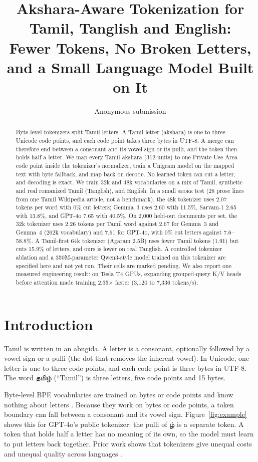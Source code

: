 \documentclass[11pt]{article}
\title{Akshara-Aware Tokenization for Tamil, Tanglish and English:\\
Fewer Tokens, No Broken Letters, and a Small Language Model Built on It}
\author{Anonymous submission}
\newcommand{\ta}[1]{{\tamilfont #1}}
\newcommand{\smoke}{\textsc{smoke}}
\begin{document}
\maketitle

\begin{abstract}
Byte-level tokenizers split Tamil letters.
A Tamil letter (akshara) is one to three Unicode code points, and each code point takes three bytes in UTF-8.
A merge can therefore end between a consonant and its vowel sign or its pulli, and the token then holds half a letter.
We map every Tamil akshara (312 units) to one Private Use Area code point inside the tokenizer's normalizer, train a Unigram model on the mapped text with byte fallback, and map back on decode.
No learned token can cut a letter, and decoding is exact.
We train 32k and 48k vocabularies on a mix of Tamil, synthetic and real romanized Tamil (Tanglish), and English.
In a small \smoke{} test (28 prose lines from one Tamil Wikipedia article, not a benchmark), the 48k tokenizer uses 2.07 tokens per word with 0\% cut letters; Gemma~3 uses 2.60 with 11.5\%, Sarvam-1 2.65 with 13.8\%, and GPT-4o 7.65 with 40.5\%.
On 2,000 held-out documents per set, the 32k tokenizer uses 2.26 tokens per Tamil word against 2.67 for Gemma~3 and Gemma~4 (262k vocabulary) and 7.61 for GPT-4o, with 0\% cut letters against 7.6--58.8\%. A Tamil-first 64k tokenizer (Agaram 2.5B) uses fewer Tamil tokens (1.91) but cuts 15.9\% of letters, and ours is lower on real Tanglish. A controlled tokenizer ablation and a 350M-parameter Qwen3-style model trained on this tokenizer are specified here and not yet run. Their cells are marked pending.
We also report one measured engineering result: on Tesla T4 GPUs, expanding grouped-query K/V heads before attention made training 2.35$\times$ faster (3,120 to 7,336 tokens/s).
\end{abstract}

\section{Introduction}

Tamil is written in an abugida.
A letter is a consonant, optionally followed by a vowel sign or a pulli (the dot that removes the inherent vowel).
In Unicode, one letter is one to three code points, and each code point is three bytes in UTF-8.
The word \ta{தமிழ்} (``Tamil'') is three letters, five code points and 15 bytes.

Byte-level BPE vocabularies are trained on bytes or code points and know nothing about letters \cite{sennrich2016bpe,kudo2018sentencepiece}.
Because they work on bytes or code points, a token boundary can fall between a consonant and its vowel sign.
Figure~\ref{fig:example} shows this for GPT-4o's public tokenizer: the pulli of \ta{ழ்} is a separate token.
A token that holds half a letter has no meaning of its own, so the model must learn to put letters back together.
Prior work shows that tokenizers give unequal costs and unequal quality across languages \cite{rust2021good,petrov2023unfair,ahia2023cost}.
\end{document}
